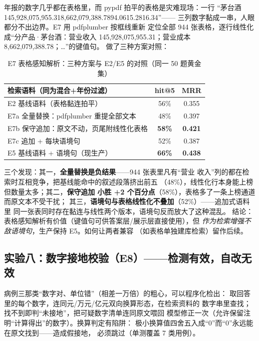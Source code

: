 \documentclass[UTF8,11pt]{ctexart}
\begin{document}
{\sloppy
年报的数字几乎都在表格里，而 pypdf 拍平的表格是灾难现场：一行
``茅台酒145,928,075,955.318,662,079,388.7894.0615.2816.34''——
三列数字黏成一串，人眼都分不出边界。E7 用 pdfplumber 按框线重新
定位全部 944 张表格，逐行线性化成``分产品·茅台酒：营业收入
145,928,075,955.31；营业成本 8,662,079,388.78；\ldots''的键值句。
做了三种方案对照：\par}

\begin{table}[H]
\centering\small
\begin{tabular}{lcc}
\toprule
检索语料（同为混合+年份过滤） & hit@5 & MRR \\
\midrule
E2 基线语料（表格黏连拍平） & 56\% & 0.355 \\
E7a 全量替换：pdfplumber 重提全部文本 & 48\% & 0.397 \\
E7b 保守追加：原文不动，页尾附线性化表格 & \textbf{58\%} & \textbf{0.421} \\
E7c 追加 + 每块语境句 & 52\% & 0.387 \\
E5 基线语料 + 语境句（现生产） & \textbf{66\%} & \textbf{0.438} \\
\bottomrule
\end{tabular}
\caption{E7 表格感知解析：三种方案与 E2/E5 的对照（同一 50 题黄金集）}
\label{tab:e7}
\end{table}

三个发现：其一，\textbf{全量替换是负结果}——944 张表里凡有``营业
收入''列的都在检索时互相竞争，把基线能命中的叙述段落挤出前五
（48\%），线性化行本身能上榜但数量太多；其二，\textbf{保守追加
小胜 +2 个百分点}（58\%），表格多了一条上榜通道而原文本不受干扰；
其三，\textbf{语境句与表格线性化不叠加}（52\%）——追加式语料里
同一张表同时存在黏连与线性两个版本，语境句反而放大了这种混乱。
结论：表格感知解析有价值（键值句可供答案层/展示层直接使用），但
\emph{作为检索增强不敌语境句}，生产保持 E5。如何让两者兼容
（如表格单独建库检索）留作后续。

\subsection{实验八：数字接地校验（E8）——检测有效，自改无效}

病例三那类``数字对、单位错''（相差一万倍）的粗心，可以程序化检出：
取回答里的每个数字，连同元/万元/亿元双向换算形态，在检索资料的
数字串里查找；找不到即判``未接地''，把可疑数字清单连同原文喂回
模型修正一次（允许保留注明``计算得出''的数字）。换算判定有陷阱：
极小换算值四舍五入成``0''而``0''永远能在原文找到——造成假接地，
必须跳过（单测覆盖 7 类用例）。
\end{document}
